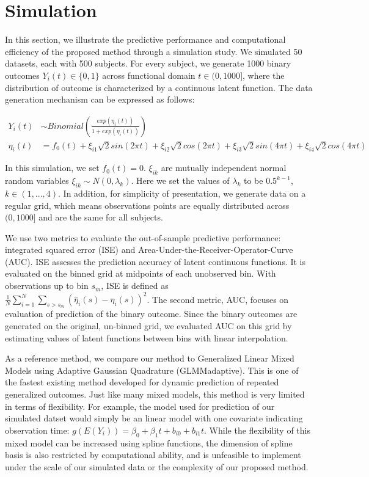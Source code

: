 \documentclass[
  11pt,
]{article}
\begin{document}
\hypertarget{simulation}{%
\section{Simulation}\label{simulation}}

In this section, we illustrate the predictive performance and
computational efficiency of the proposed method through a simulation
study. We simulated 50 datasets, each with 500 subjects. For every
subject, we generate 1000 binary outcomes \(Y_i(t) \in \{0, 1\}\) across
functional domain \(t \in (0, 1000]\), where the distribution of outcome
is characterized by a continuous latent function. The data generation
mechanism can be expressed as follows:

\[\begin{aligned}
Y_i(t) & \sim Binomial(\frac{exp(\eta_i(t))}{1+exp(\eta_i(t))}) \\
\eta_i(t) &= f_0(t)+ \xi_{i1}\sqrt{2}sin(2\pi t)+\xi_{i2}\sqrt{2}cos(2\pi t)+\xi_{i3}\sqrt{2}sin(4\pi t)+\xi_{i4}\sqrt{2}cos(4\pi t)
\end{aligned}\]

In this simulation, we set \(f_0(t) = 0\). \(\xi_{ik}\) are mutually
independent normal random variables \(\xi_{ik}\sim N(0, \lambda_k)\).
Here we set the values of \(\lambda_k\) to be \(0.5^{k-1}\),
\(k \in (1,..., 4)\). In addition, for simplicity of presentation, we
generate data on a regular grid, which means observations points are
equally distributed across \((0, 1000]\) and are the same for all
subjects.

We use two metrics to evaluate the out-of-sample predictive performance:
integrated squared error (ISE) and
Area-Under-the-Receiver-Operator-Curve (AUC). ISE assesses the
prediction accuracy of latent continuous functions. It is evaluated on
the binned grid at midpoints of each unobserved bin. With observations
up to bin \(s_m\), ISE is defined as
\(\frac{1}{N}\sum_{i=1}^N\sum_{s>s_m} (\hat{\eta}_i(s)-\eta_i(s))^2\).
The second metric, AUC, focuses on evaluation of prediction of the
binary outcome. Since the binary outcomes are generated on the original,
un-binned grid, we evaluated AUC on this grid by estimating values of
latent functions between bins with linear interpolation.

As a reference method, we compare our method to Generalized Linear Mixed
Models using Adaptive Gaussian Quadrature (GLMMadaptive). This is one of
the fastest existing method developed for dynamic prediction of repeated
generalized outcomes. Just like many mixed models, this method is very
limited in terms of flexibility. For example, the model used for
prediction of our simulated datset would simply be an linear model with
one covariate indicating observation time:
\(g(E(Y_i)) = \beta_0+\beta_1t+b_{i0}+b_{i1}t\). While the flexibility
of this mixed model can be increased using spline functions, the
dimension of spline basis is also restricted by computational ability,
and is unfeasible to implement under the scale of our simulated data or
the complexity of our proposed method.
\end{document}
